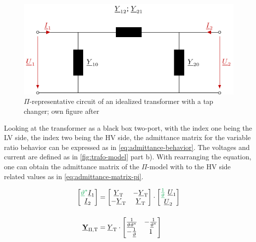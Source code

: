 \begin{figure}%
    \centering
    \includegraphics[width=.7\textwidth]{tikz_graphics/images/transformer_pi.pdf}
    \caption[$\Pi$-representative circuit of an idealized transformer with a tap changer]{$\Pi$-representative circuit of an idealized transformer with a tap changer; own figure after \autocite{milanoPowerSystemModelling2010,burlakinEnhancedVoltageControl2024}}
    \label{fig:pi-transformer}
\end{figure}

Looking at the transformer as a black box two-port, with the index one being the \acs{LV} side, the index two being the \acs{HV} side, the admittance matrix for the variable ratio behavior can be expressed as in \autoref{eq:admittance-behavior}. The voltages and current are defined as in \autoref{fig:trafo-model} part b). With rearranging the equation, one can obtain the admittance matrix of the $\Pi$-model with to the \acs{HV} side related values as in \autoref{eq:admittance-matrix-pi}. \autocite{milanoPowerSystemModelling2010,burlakinEnhancedVoltageControl2024}

\begin{align}
    \begin{bmatrix}
        {\color{ees_green}\underline{\vartheta}^*} \underline{I}_1 \\ \underline{I}_2
    \end{bmatrix}&= 
    \begin{bmatrix}
        \underline{Y}_\mathrm{T} & -\underline{Y}_\mathrm{T} \\
        -\underline{Y}_\mathrm{T} & \underline{Y}_\mathrm{T}
    \end{bmatrix} \cdot
    \begin{bmatrix}
        {\color{ees_green}\frac{1}{\underline{\vartheta}}}~\underline{U}_1 \\ \underline{U}_2
    \end{bmatrix} \label{eq:admittance-behavior} \\[12pt]
    \underline{\mab{Y}}_\mathrm{\Pi,T}&=\underline{Y}_\mathrm{T} \cdot
    \begin{bmatrix}
        \frac{1}{\underline{\vartheta}\underline{\vartheta}^*} & -\frac{1}{\underline{\vartheta}^*} \\
        -\frac{1}{\underline{\vartheta}} & 1
    \end{bmatrix} \label{eq:admittance-matrix-pi}
\end{align}

